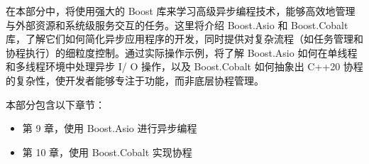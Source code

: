 在本部分中，将使用强大的 Boost 库来学习高级异步编程技术，能够高效地管理与外部资源和系统级服务交互的任务。这里将介绍 Boost.Asio 和 Boost.Cobalt 库，了解它们如何简化异步应用程序的开发，同时提供对复杂流程（如任务管理和协程执行）的细粒度控制。通过实际操作示例，将了解 Boost.Asio 如何在单线程和多线程环境中处理异步 I/ O 操作，以及 Boost.Cobalt 如何抽象出 C++20 协程的复杂性，使开发者能够专注于功能，而非底层协程管理。

本部分包含以下章节：

\begin{itemize}
\item
第 9 章，使用 Boost.Asio 进行异步编程

\item
第 10 章，使用 Boost.Cobalt 实现协程
\end{itemize}